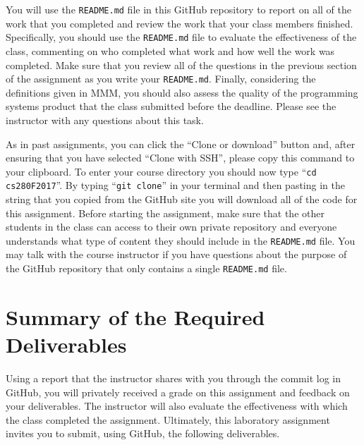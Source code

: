 \documentclass[11pt]{article}
\newcommand{\reflection}{\lstinline{README.md}}
\newcommand{\command}[1]{``\lstinline{#1}''}
\begin{document}
You will use the \reflection{} file in this GitHub repository to report on all of the work that you completed and review
the work that your class members finished. Specifically, you should use the \reflection{} file to evaluate the
effectiveness of the class, commenting on who completed what work and how well the work was completed. Make sure that
you review all of the questions in the previous section of the assignment as you write your \reflection{}. Finally,
considering the definitions given in MMM, you should also assess the quality of the programming systems product that the
class submitted before the deadline. Please see the instructor with any questions about this task.

As in past assignments, you can click the ``Clone or download'' button and, after ensuring that you have selected
``Clone with SSH'', please copy this command to your clipboard. To enter your course directory you should now type
\command{cd cs280F2017}. By typing \command{git clone} in your terminal and then pasting in the string that you copied
from the GitHub site you will download all of the code for this assignment. Before starting the assignment, make sure
that the other students in the class can access to their own private repository and everyone understands what type of
content they should include in the \reflection{} file. You may talk with the course instructor if you have questions
about the purpose of the GitHub repository that only contains a single \reflection{} file.

\section*{Summary of the Required Deliverables}

Using a report that the instructor shares with you through the commit log in GitHub, you will privately received a grade
on this assignment and feedback on your deliverables. The instructor will also evaluate the effectiveness with which the
class completed the assignment. Ultimately, this laboratory assignment invites you to submit, using GitHub, the
following deliverables.

\vspace*{-.5em}
\end{document}
